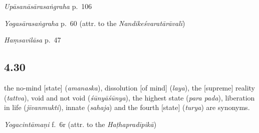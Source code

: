 \begin{ekdosis}
\begin{testimonia}[hp04_029]
\emph{Upāsanāsārasaṅgraha} p.~106
\begin{versinnote}
\end{versinnote}

\emph{Yogasārasaṅgraha} p.~60 (attr. to the \emph{Nandikeśvaratārāvalī})
\begin{versinnote}
\end{versinnote}

\emph{Haṃsavilāsa} p.~47
\begin{versinnote}
\end{versinnote}
\end{testimonia}


\subsection*{4.30}
\begin{translation}[hp04_030]
[\dots] the no-mind [state] (\emph{amanaska}), dissolution [of mind] (\emph{laya}), the [supreme] reality (\emph{tattva}), void and not void (\textit{śūnyāśūnya}), the highest state (\emph{para pada}), liberation in life (\emph{jīvanmukti}), innate (\emph{sahaja}) and the fourth [state] (\emph{turya}) are synonyms.
\end{translation}
% 

\begin{sources}[hp04_030]
\emph{Yogacintāmaṇi} f.~6r (attr. to the \emph{Haṭhapradīpikā})
\begin{versinnote}
\end{versinnote}


\end{sources}
\end{ekdosis}
